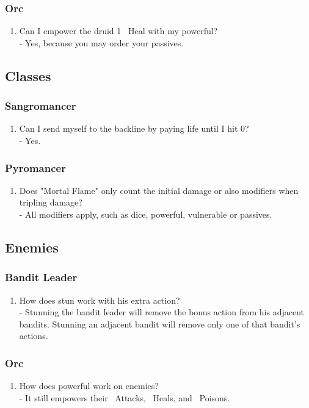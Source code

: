 \subsubsection*{Orc}
\begin{enumerate}
	\item Can I empower the druid 1 \symHeal~Heal with my powerful?\\
	\hspace*{1cm}- Yes, because you may order your passives.
\end{enumerate}

\subsection*{Classes}

\subsubsection*{Sangromancer}
\begin{enumerate}
	\item Can I send myself to the backline by paying life until I hit 0?\\
	\hspace*{1cm}- Yes.
\end{enumerate}

\subsubsection*{Pyromancer}
\begin{enumerate}
	\item Does "Mortal Flame" only count the initial damage or also modifiers when tripling damage?\\
	\hspace*{1cm}- All modifiers apply, such as dice, powerful, vulnerable or passives.
\end{enumerate}


\subsection*{Enemies}
\subsubsection*{Bandit Leader}
\begin{enumerate}
	\item How does stun work with his extra action?\\
	\hspace*{1cm}- Stunning the bandit leader will remove the bonus action from his adjacent bandits. Stunning an adjacent bandit will remove only one of that bandit's actions.
\end{enumerate}

\subsubsection*{Orc}
\begin{enumerate}
	\item How does powerful work on enemies?\\
	\hspace*{1cm}- It still empowers their \symAttack~Attacks, \symHeal~Heals, and \symPoison~Poisons.
\end{enumerate}
